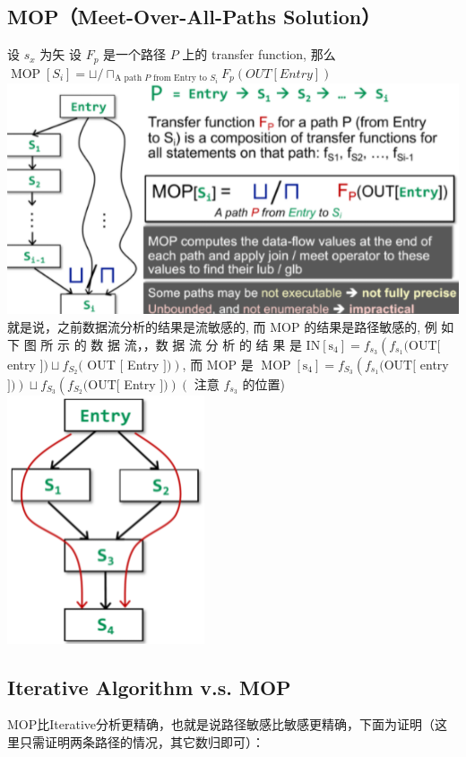 \documentclass[a4paper]{article}
\theoremstyle{definition}
\begin{document}
\subsection{MOP（Meet-Over-All-Paths Solution）}
设 $s_{x}$ 为矢 设 $F_{p}$ 是一个路径 $P$ 上的 transfer function, 那么 $\operatorname{MOP}\left[S_{i}\right]=\sqcup / \sqcap_{\mathrm{A} \text { path } P \text { from Entry to } S_{i}} F_{p}(O U T[E n t r y])$
\\
\includegraphics{img/moap.png}\\
就是说，之前数据流分析的结果是流敏感的, 而 MOP 的结果是路径敏感的,
例 如 下 图 所 示 的 数 据 流，，数 据 流 分 析 的 结 果 是
$\mathrm{IN}\left[\mathrm{s}_{4}\right]=f_{s_{3}}\left(f_{s_{1}}(\mathrm{OUT}[\right.$ entry $]) \sqcup f_{S_{2}}($ OUT $[$ Entry $\left.])\right)$, 而 MOP 是
$\operatorname{MOP}\left[\mathrm{s}_{4}\right]=f_{S_{3}}\left(f_{s_{1}}(\mathrm{OUT}[\right.$ entry $\left.])\right) \sqcup f_{S_{3}}\left(f_{S_{2}}(\mathrm{OUT}[\right.$ Entry $\left.])\right)\left(\right.$ 注意 $f_{s_{3}}$
的位置)\\
\includegraphics{img/mop.png}
\subsection{Iterative Algorithm v.s. MOP}
MOP比Iterative分析更精确，也就是说路径敏感比敏感更精确，下面为证明（这里只需证明两条路径的情况，其它数归即可）：
\end{document}
